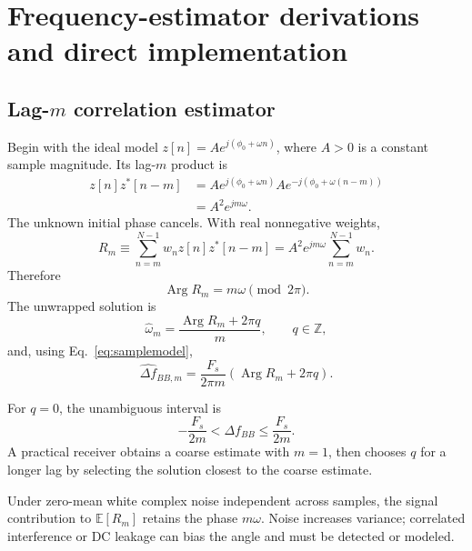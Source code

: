 \documentclass[10pt,a4paper]{article}
\newcommand{\E}{\mathbb{E}}
\newcommand{\argp}{\operatorname{Arg}}
\begin{document}
\section{Frequency-estimator derivations and direct implementation}
\label{sec:estimators}
\subsection{Lag-$m$ correlation estimator}
Begin with the ideal model $z[n]=Ae^{j(\phi_0+\omega n)}$, where $A>0$ is a constant sample magnitude. Its lag-$m$ product is
\begin{align}
z[n]z^*[n-m]
&=A e^{j(\phi_0+\omega n)}A e^{-j(\phi_0+\omega(n-m))}\\
&=A^2e^{jm\omega}.
\label{eq:lagproduct}
\end{align}
The unknown initial phase cancels. With real nonnegative weights,
\begin{equation}
R_m\equiv\sum_{n=m}^{N-1}w_nz[n]z^*[n-m]
=A^2e^{jm\omega}\sum_{n=m}^{N-1}w_n.
\label{eq:rmideal}
\end{equation}
Therefore
\begin{equation}
\argp R_m=m\omega\pmod{2\pi}.
\end{equation}
The unwrapped solution is
\begin{equation}
\widehat\omega_m=\frac{\argp R_m+2\pi q}{m},\qquad q\in\mathbb Z,
\label{eq:omegaest}
\end{equation}
and, using Eq.~\ref{eq:samplemodel},
\begin{equation}
\widehat{\Delta f}_{BB,m}
=\frac{F_s}{2\pi m}\left(\argp R_m+2\pi q\right).
\label{eq:dfcorr}
\end{equation}

For $q=0$, the unambiguous interval is
\begin{equation}
-\frac{F_s}{2m}<\Delta f_{BB}\le\frac{F_s}{2m}.
\end{equation}
A practical receiver obtains a coarse estimate with $m=1$, then chooses $q$ for a longer lag by selecting the solution closest to the coarse estimate.

Under zero-mean white complex noise independent across samples, the signal contribution to $\E[R_m]$ retains the phase $m\omega$. Noise increases variance; correlated interference or DC leakage can bias the angle and must be detected or modeled.
\end{document}
